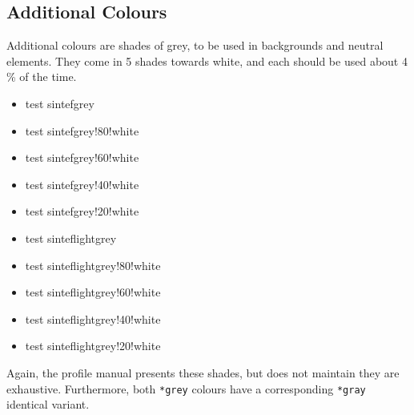 \documentclass{sintefdoc}
\newcommand{\testcolor}[1]{\colorbox{#1}{\textcolor{#1}{test}} #1}
\begin{document}
\subsection*{Additional Colours}
Additional colours are shades of grey, to be used in backgrounds and neutral
elements. They come in 5 shades towards white, and each should be used about
4\,\% of the time.
\begin{itemize}
\item \testcolor{sintefgrey}
\item \testcolor{sintefgrey!80!white}
\item \testcolor{sintefgrey!60!white}
\item \testcolor{sintefgrey!40!white}
\item \testcolor{sintefgrey!20!white}
\item \testcolor{sinteflightgrey}
\item \testcolor{sinteflightgrey!80!white}
\item \testcolor{sinteflightgrey!60!white}
\item \testcolor{sinteflightgrey!40!white}
\item \testcolor{sinteflightgrey!20!white}
\end{itemize}
Again, the profile manual presents these shades, but does not maintain they are
exhaustive.
Furthermore, both \texttt{*grey} colours have a corresponding \texttt{*gray}
identical variant.
\end{document}
